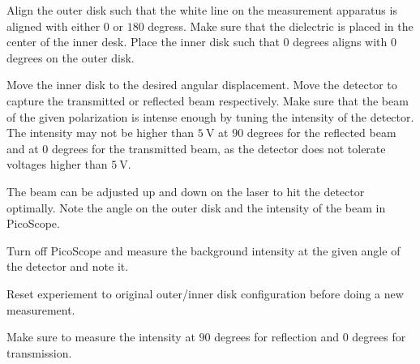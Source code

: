 Align the outer disk such that the white line on the measurement apparatus is aligned with either $0$ or $180$ degress. Make sure that the dielectric is placed in the center of the inner desk. Place the inner disk such that $0$ degrees aligns with $0$ degrees on the outer disk.

Move the inner disk to the desired angular displacement. Move the detector to capture the transmitted or reflected beam respectively. Make sure that the beam of the given polarization is intense enough by tuning the intensity of the detector. The intensity may not be higher than $\SI{5}{\volt}$ at $90$ degrees for the reflected beam and at $0$ degrees for the transmitted beam, as the detector does not tolerate voltages higher than $\SI{5}{\volt}$. 

The beam can be adjusted up and down on the laser to hit the detector optimally. Note the angle on the outer disk and the intensity of the beam in PicoScope.

Turn off PicoScope and measure the background intensity at the given angle of the detector and note it.

Reset experiement to original outer/inner disk configuration before doing a new measurement.

Make sure to measure the intensity at $90$ degrees for reflection and $0$ degrees for transmission. 
